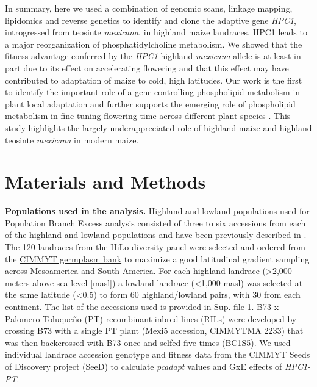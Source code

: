 \documentclass[9pt,twocolumn,twoside,lineno]{biorxiv}
\newcommand{\mex}{\textit{mexicana}\xspace}
\newcommand{\hpc}{\textit{HPC1}\xspace}
\begin{document}
In summary, here we used a combination of genomic scans, linkage mapping, lipidomics and reverse genetics to identify and clone the adaptive gene \hpc, introgressed from teosinte  \mex, in highland maize landraces. HPC1 leads to a major reorganization of phosphatidylcholine metabolism. 
We showed that the fitness advantage conferred by the \hpc highland \mex allele is at least in part due to its effect on accelerating flowering and that this effect may have contributed to adaptation of maize to cold, high latitudes. 
Our work is the first to identify the important role of a gene controlling phospholipid metabolism in plant local adaptation and further supports the emerging role of phospholipid metabolism in fine-tuning flowering time across different plant species \cite{Nakamura2014-qf, Susila2021-dz, Guo2019-pn}.
This study highlights the largely underappreciated role of highland maize and highland teosinte \mex in modern maize.

\section{Materials and Methods}
\label{sec:materials:methods}
\textbf{Populations used in the analysis.} 
Highland and lowland populations used for Population Branch Excess analysis consisted of three to six accessions from each of the highland and lowland populations and have been previously described in \cite{Wang2020-mp, Wang2017-bc}. 
The 120 landraces from the HiLo diversity panel were selected and ordered from the \href{http://mgb.cimmyt.org/gringlobal/search.aspx}{CIMMYT germplasm bank} to maximize a good latitudinal gradient sampling across Mesoamerica and South America. 
For each highland landrace (>2,000 meters above sea level [masl]) a lowland landrace (<1,000 masl) was selected at the same latitude (<0.5\degree) to form 60 highland/lowland pairs, with 30 from each continent. 
The list of the accessions used is provided in Sup. file 1.   
B73 x Palomero Toluqueño (PT) recombinant inbred lines (RILs) were developed by crossing B73 with a single PT plant (Mexi5 accession, CIMMYTMA 2233) that was then backcrossed with B73 once and selfed five times (BC1S5).  
We used  individual landrace accession genotype and fitness data from the CIMMYT Seeds of Discovery project (SeeD) \cite{Gates2019-xu} to calculate \textit{pcadapt} \cite{Luu2017-ws} values and GxE effects of \textit{HPC1-PT}.
\end{document}
